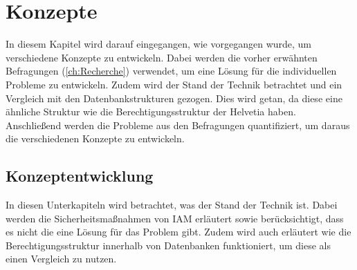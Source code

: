\chapter{Konzepte}
\label{ch:chapter04}
In diesem Kapitel wird darauf eingegangen, wie vorgegangen wurde, um verschiedene Konzepte zu entwickeln.
Dabei werden die vorher erwähnten Befragungen (\ref{ch:Recherche}) verwendet, um eine Lösung für die individuellen Probleme zu entwickeln.
Zudem wird der Stand der Technik betrachtet und ein Vergleich mit den Datenbankstrukturen gezogen.
Dies wird getan, da diese eine ähnliche Struktur wie die Berechtigungsstruktur der Helvetia haben. 
Anschließend werden die Probleme aus den Befragungen quantifiziert, um daraus die verschiedenen Konzepte zu entwickeln.

\section{Konzeptentwicklung}
\label{sec:chapter04:Konzeptentwicklung}
In diesen Unterkapiteln wird betrachtet, was der Stand der Technik ist.
Dabei werden die Sicherheitsmaßnahmen von \ac{IAM} erläutert sowie berücksichtigt, dass es nicht die eine Lösung für das Problem gibt.
Zudem wird auch erläutert wie die Berechtigungsstruktur innerhalb von Datenbanken funktioniert, um diese als einen Vergleich zu nutzen.  

